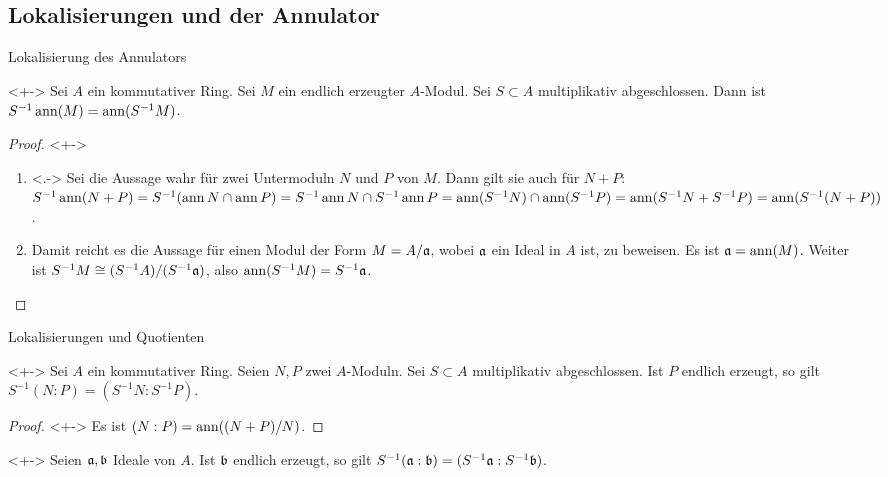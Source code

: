 \subsection{Lokalisierungen und der Annulator}

\begin{frame}{Lokalisierung des Annulators}
	\begin{proposition}<+->
		Sei \(A\) ein kommutativer Ring. Sei \(M\) ein endlich erzeugter \(A\)-Modul. Sei \(S \subset A\) multiplikativ abgeschlossen.
		Dann ist \(S^{-1} \operatorname{ann}(M) = \operatorname{ann}(S^{-1} M)\).
	\end{proposition}
	\begin{proof}<+->
		\begin{enumerate}[<+->]
		\item<.->
			Sei die Aussage wahr für zwei Untermoduln \(N\) und \(P\) von \(M\). Dann gilt sie auch für \(N + P\):
			\(S^{-1} \operatorname{ann}(N + P) = S^{-1} (\operatorname{ann} N \cap \operatorname{ann} P) = S^{-1} \operatorname{ann} N \cap S^{-1} \operatorname{ann} P
			= \operatorname{ann}(S^{-1} N) \cap \operatorname{ann}(S^{-1} P) = \operatorname{ann}(S^{-1} N + S^{-1} P) = \operatorname{ann}(S^{-1} (N + P))\).
		\item
			Damit reicht es die Aussage für einen Modul der Form \(M = A/\mathfrak{a}\), wobei \(\mathfrak{a}\) ein Ideal in \(A\) ist,
			zu beweisen. Es ist \(\mathfrak{a} = \operatorname{ann}(M)\). Weiter ist \(S^{-1} M \cong (S^{-1} A)/(S^{-1} \mathfrak{a})\), also
			\(\operatorname{ann}(S^{-1} M) = S^{-1} \mathfrak{a}\).
			\qedhere
		\end{enumerate}
	\end{proof}
\end{frame}

\begin{frame}{Lokalisierungen und Quotienten}
	\begin{corollary}<+->
		Sei \(A\) ein kommutativer Ring. Seien \(N, P\) zwei \(A\)-Moduln. Sei \(S \subset A\) multiplikativ abgeschlossen.
		Ist \(P\) endlich erzeugt, so gilt \(S^{-1} (N : P) = (S^{-1} N : S^{-1} P)\).
	\end{corollary}
	\begin{proof}<+->
		Es ist \((N : P) = \operatorname{ann}((N + P)/N)\).
	\end{proof}
	\begin{example}<+->
		Seien \(\mathfrak{a}, \mathfrak{b}\) Ideale von \(A\). Ist \(\mathfrak{b}\) endlich erzeugt, so gilt
		\(S^{-1} (\mathfrak{a} : \mathfrak{b}) = (S^{-1} \mathfrak{a} : S^{-1} \mathfrak{b})\).
	\end{example}
\end{frame}

